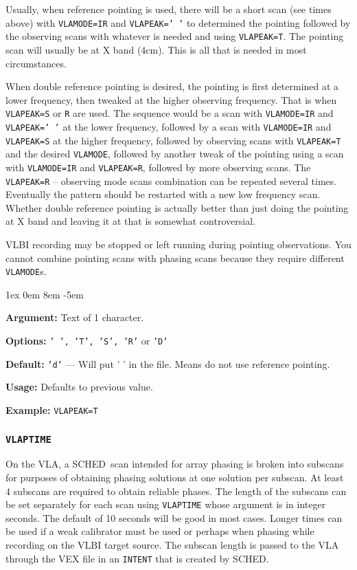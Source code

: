 \documentclass{report}
\newcommand{\sched}{{\sc SCHED}}
\newcommand{\schedb}{{\sc SCHED~}}
\newcommand{\rcwbox}[5]{
  \begin{list}{}{\parsep 1ex  \itemsep 0em
                 \leftmargin 8em  \itemindent -5em }
    \item {\bf Argument:} #1
    \item {\bf Options:}  #2
    \item {\bf Default:}  #3
    \item {\bf Usage:}    #4
    \item {\bf Example:}  #5
  \end{list}
}
\begin{document}
Usually, when reference pointing is used, there will be a short
scan (see times above) with {\tt VLAMODE=IR} and {\tt VLAPEAK=' '}
to determined the pointing followed by the observing scans with
whatever  is needed and using
{\tt VLAPEAK=T}.  The pointing scan will usually be at X band (4cm).
This is all that is needed in most circumstances.

When double reference pointing is desired, the pointing is first
determined at a lower frequency, then tweaked at the higher observing
frequency.  That is when {\tt VLAPEAK=S} or {\tt R} are used.  The
sequence would be a scan with {\tt VLAMODE=IR} and {\tt VLAPEAK=' '}
at the lower frequency, followed by a scan with {\tt VLAMODE=IR} and
{\tt VLAPEAK=S} at the higher frequency, followed by observing scans
with {\tt VLAPEAK=T} and the desired {\tt VLAMODE}, followed by
another tweak of the pointing using a scan with {\tt VLAMODE=IR} and
{\tt VLAPEAK=R}, followed by more observing scans.  The {\tt
VLAPEAK=R} -- observing mode scans combination can be repeated several
times.  Eventually the pattern should be restarted with a new low
frequency scan.  Whether double reference pointing is actually better
than just doing the pointing at X band and leaving it at that is
somewhat controversial.

VLBI recording may be stopped or left running during pointing observations.
You cannot combine pointing scans with phasing scans because they
require different {\tt VLAMODE}s.

\rcwbox
{Text of 1 character.}
{{\tt ' ', 'T', 'S', 'R'} or {\tt 'D'}}
{{\tt 'd'} --- Will put ' ' in the file.  Means do not use
reference pointing.}
{Defaults to previous value.}
{{\tt VLAPEAK=T}}


\subsubsection{\label{MP:VLAPTIME}{\tt VLAPTIME}}

On the VLA, a \schedb scan intended for array phasing is broken into
subscans for purposes of obtaining phasing solutions at one solution
per subscan.  At least 4 subscans are required to obtain reliable
phases.  The length of the subscans can be set separately for each
scan using {\tt VLAPTIME} whose argument is in integer seconds.  The default
of 10 seconds will be good in most cases.  Longer times can be used if
a weak calibrator must be used or perhaps when phasing while recording
on the VLBI target source.  The subscan length is passed to the VLA 
through the VEX file in an {\tt INTENT} that is created by \sched.
\end{document}
